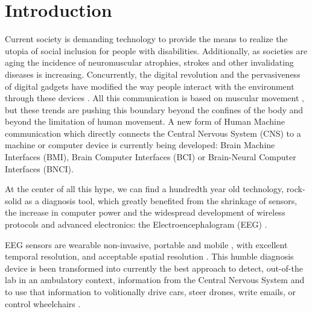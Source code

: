 \documentclass[sensors,article,submit,moreauthors,pdftex,10pt,a4paper]{mdpi}
\begin{document}

\setcounter{section}{-1} %

\section{Introduction}






Current society is demanding technology to provide the means to realize the utopia of social inclusion for people with disabilities\citep{Wolpaw2002}.  Additionally, as societies are aging \citep{Lutz2008} the incidence of neuromuscular atrophies, strokes and other invalidating diseases is increasing.  Concurrently, the digital revolution and the pervasiveness of digital gadgets have modified the way people interact with the environment through these devices \citep{Domingo2012}.  All this communication is based on muscular movement \citep{Guger2017}, but these trends are pushing this boundary beyond the confines of the body and beyond the limitation of human movement.  A new form of Human Machine communication which directly connects the Central Nervous System (CNS) to a machine or computer device is currently being developed: Brain Machine Interfaces (BMI), Brain Computer Interfaces (BCI) or Brain-Neural Computer Interfaces (BNCI).

At the center of all this hype, we can find a hundredth year old technology, rock-solid as a diagnosis tool, which greatly benefited from the shrinkage of sensors, the increase in computer power and the widespread development of wireless protocols and advanced electronics: the Electroencephalogram (EEG) \citep{Schomer2010}.

EEG sensors are wearable \citep{Puce2017} non-invasive, portable and mobile \citep{DeVos2014}, with excellent temporal resolution, and acceptable spatial resolution \citep{Hartman2005}.  This humble diagnosis device is been transformed into currently the best approach to detect, out-of-the lab in an ambulatory context, information from the Central Nervous System and to use that information to volitionally drive cars, steer drones, write emails, or control wheelchairs \citep{Yuste2017}.
\end{document}
